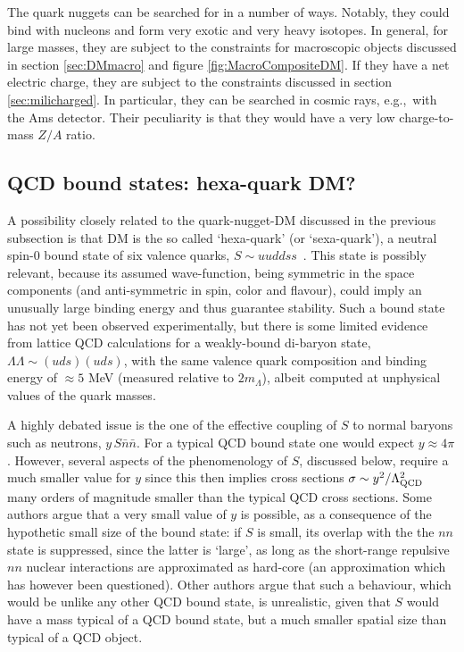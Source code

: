 \smallskip

The quark nuggets  can be searched for in a number of ways. Notably, they could bind with nucleons and form very exotic and very heavy isotopes. In general, for large masses, they are subject to the constraints for macroscopic objects discussed in section \ref{sec:DMmacro} and figure \ref{fig:MacroCompositeDM}.
If they have a net electric charge, they are subject to the constraints discussed in section \ref{sec:milicharged}. 
In particular, they can be searched in cosmic rays, e.g.,~with the {\sc Ams} detector. 
Their peculiarity is that they would have a very low charge-to-mass $Z/A$ ratio.



\subsection{QCD bound states: hexa-quark DM?}
\label{sec:hexaquark}
A possibility closely related to the quark-nugget-DM discussed in the previous subsection is that DM is the so called `hexa-quark' (or `sexa-quark'), 
a neutral spin-0 bound state of six valence quarks, $S\sim uuddss$~\cite{6q}. 
This state is possibly relevant, because its assumed wave-function, being symmetric in the space components 
(and anti-symmetric in spin, color and flavour),
could imply an unusually large binding energy and thus guarantee stability. 
Such a bound state has not yet been  observed experimentally, but there is some limited evidence from lattice QCD calculations for a weakly-bound di-baryon state, $ \Lambda \Lambda\sim(uds)(uds)$, with the same valence quark composition and binding energy of $\approx 5$ MeV (measured relative to $2m_{\Lambda}$), 
albeit computed at unphysical values of the quark masses. 

\smallskip

A highly debated issue is the one of the effective coupling of $S$ to normal baryons such as neutrons, $y\, S \bar{n}\bar{n}$. For a typical QCD bound state one would expect $y \approx 4\pi$. However, several aspects of the phenomenology of $S$, discussed below, require a much smaller value for $y$ since this then implies cross sections $\sigma \sim y^2/\Lambda^2_{\rm QCD}$ many orders of magnitude smaller than the typical QCD cross sections.
Some authors \cite{6q} argue that a very small value of $y$ is possible, as a consequence of the hypothetic small size of the bound state: if $S$ is small, its overlap with the the $nn$ state is suppressed, since the latter is `large', as long as the short-range repulsive $nn$ nuclear interactions are approximated as hard-core (an approximation which has however been questioned). 
Other authors argue that such a behaviour, which would be unlike any other QCD bound state, is unrealistic, given that $S$ would have a mass typical of a QCD bound state, but a much smaller spatial size than typical of a QCD object.

